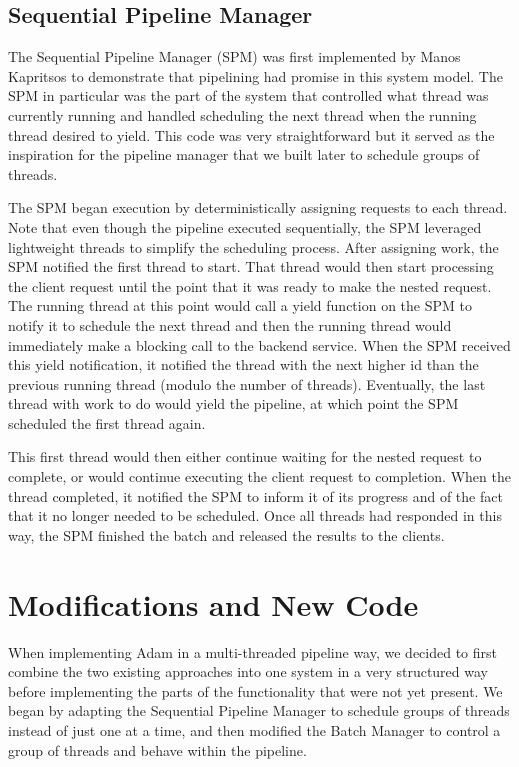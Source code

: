 \documentclass[11pt, oneside]{report}
\begin{document}
\subsection{Sequential Pipeline Manager}

The Sequential Pipeline Manager (SPM) was first implemented by Manos Kapritsos to demonstrate that pipelining had promise in this system model. The SPM in particular was the part of the system that controlled what thread was currently running and handled scheduling the next thread when the running thread desired to yield. This code was very straightforward but it served as the inspiration for the pipeline manager that we built later to schedule groups of threads.

The SPM began execution by deterministically assigning requests to each thread. Note that even though the pipeline executed sequentially, the SPM leveraged lightweight threads to simplify the scheduling process. After assigning work, the SPM notified the first thread to start. That thread would then start processing the client request until the point that it was ready to make the nested request. The running thread at this point would call a yield function on the SPM to notify it to schedule the next thread and then the running thread would immediately make a blocking call to the backend service. When the SPM received this yield notification, it notified the thread with the next higher id than the previous running thread (modulo the number of threads). Eventually, the last thread with work to do would yield the pipeline, at which point the SPM scheduled the first thread again. 

This first thread would then either continue waiting for the nested request to complete, or would continue executing the client request to completion. When the thread completed, it notified the SPM to inform it of its progress and of the fact that it no longer needed to be scheduled. Once all threads had responded in this way, the SPM finished the batch and released the results to the clients.

\section{Modifications and New Code}

When implementing Adam in a multi-threaded pipeline way, we decided to first combine the two existing approaches into one system in a very structured way before implementing the parts of the functionality that were not yet present. We began by adapting the Sequential Pipeline Manager to schedule groups of threads instead of just one at a time, and then modified the Batch Manager to control a group of threads and behave within the pipeline.
\end{document}
